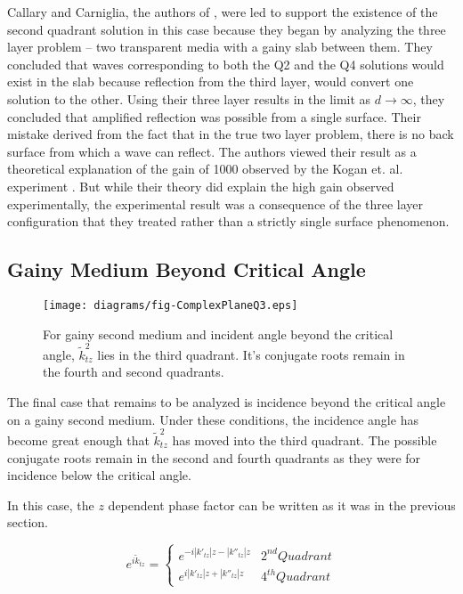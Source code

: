 \documentclass[12pt]{uthesis-v12}
\begin{document}
Callary and Carniglia, the authors of \cite{CandC}, were led to support the existence of the second quadrant solution in this case because they began by analyzing the three layer problem -- two transparent media with a gainy slab between them. They concluded that waves corresponding to both the Q2 and the Q4 solutions would exist in the slab because reflection from the third layer, would convert one solution to the other. Using their three layer results in the limit as $d\to\infty$, they concluded that amplified reflection was possible from a single surface. Their mistake derived from the fact that in the true two layer problem, there is no back surface from which a wave can reflect. The authors viewed their result as a theoretical explanation of the gain of 1000 observed by the Kogan et. al. experiment \cite{Kogan2}. But while their theory did explain the high gain observed experimentally, the experimental result was a consequence of the three layer configuration that they treated rather than a strictly single surface phenomenon.

\subsection{Gainy Medium Beyond Critical Angle}

\begin{figure}[htb]
\centering
  \texttt{[image: diagrams/fig-ComplexPlaneQ3.eps]}
\caption[$\tilde{k}_{tz}^2$ complex plane diagram, $\gamma>0$, $\theta_i>\theta_c$]{For gainy second medium and incident angle beyond the critical angle, $\tilde{k}_{tz}^2$ lies in the third quadrant. It's conjugate roots remain in the fourth and second quadrants. 
 \label{fig-complexQ3}}
\end{figure}
The final case that remains to be analyzed is incidence beyond the critical angle on a gainy second medium. Under these conditions, the incidence angle has become great enough that $\tilde{k}^2_{tz}$ has moved into the third quadrant. The possible conjugate roots remain in the second and fourth quadrants as they were for incidence below the critical angle.

In this case, the $z$ dependent phase factor can be written as it was in the previous section.

\begin{equation}
e^{i\tilde{k}_{tz}} = \begin{cases}
    e^{-i|k'_{tz}|z-|k''_{tz}|z}       & 2^{nd} Quadrant \\
    e^{i|k'_{tz}|z+|k''_{tz}|z}        & 4^{th} Quadrant
\end{cases}
\end{equation}
\end{document}
